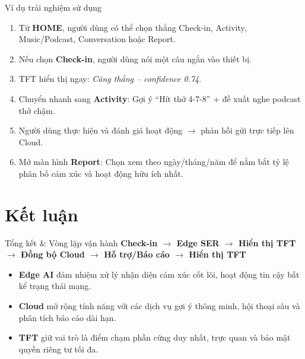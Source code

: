 \documentclass[12pt,aspectratio=169]{beamer}
\begin{document}
\begin{frame}{Ví dụ trải nghiệm sử dụng}
  \begin{enumerate}
    \item Từ \textbf{HOME}, người dùng có thể chọn thẳng Check-in, Activity, Music/Podcast, Conversation hoặc Report.
    \item Nếu chọn \textbf{Check-in}, người dùng nói một câu ngắn vào thiết bị.
    \item TFT hiển thị ngay: \textit{Căng thẳng -- confidence 0.74}.
    \item Chuyển nhanh sang \textbf{Activity}: Gợi ý ``Hít thở 4-7-8'' + đề xuất nghe podcast thở chậm.
    \item Người dùng thực hiện và đánh giá hoạt động $\rightarrow$ phản hồi gửi trực tiếp lên Cloud.
    \item Mở màn hình \textbf{Report}: Chọn xem theo ngày/tháng/năm để nắm bắt tỷ lệ phân bố cảm xúc và hoạt động hữu ích nhất.
  \end{enumerate}
\end{frame}

\section{Kết luận}

\begin{frame}{Tổng kết \& Vòng lặp vận hành}
  \centering
  \vskip 0.5cm
  {\large\color{ecPrimary}\bfseries Check-in $\rightarrow$ Edge SER $\rightarrow$ Hiển thị TFT $\rightarrow$ Đồng bộ Cloud $\rightarrow$ Hỗ trợ/Báo cáo $\rightarrow$ Hiển thị TFT}
  \vspace{0.5cm}
  \begin{itemize}
    \item \textbf{Edge AI} đảm nhiệm xử lý nhận diện cảm xúc cốt lõi, hoạt động tin cậy bất kể trạng thái mạng.
    \item \textbf{Cloud} mở rộng tính năng với các dịch vụ gợi ý thông minh, hội thoại sâu và phân tích báo cáo dài hạn.
    \item \textbf{TFT} giữ vai trò là điểm chạm phần cứng duy nhất, trực quan và bảo mật quyền riêng tư tối đa.
  \end{itemize}
\end{frame}
\end{document}
